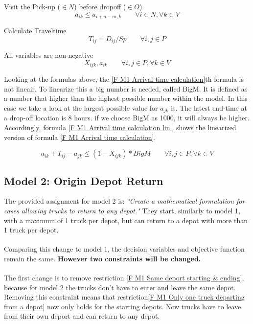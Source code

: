 Visit the Pick-up ($\in N$)  before dropoff ($\in O$) \\
\begin{equation} 
a_{ik} \leq a_{i+n-m,k}   \qquad  \forall i\in N, \forall k \in V
\label{F M1 Pick-up before dropp-off}
\end{equation}

Calculate Traveltime
\begin{equation} 
T_{ij} = D_{ij}/Sp    \qquad  \forall i,j \in P
\label{F M1 Calculate Traveltime}
\end{equation}

All variables are non-negative
\begin{equation} 
X_{ijk}, a_{ik}    \qquad  \forall i,j \in P, \forall k \in V
\label{F M1 All variables are non-negative}
\end{equation}


\vspace{0.5cm}

Looking at the formulas above, the \ref{F M1 Arrival time calculation}th formula is not lineair. To linearize this a big number is needed, called BigM. It is defined as a number that higher than the highest possible number within the model. In this case we take a look at the largest possible value for $a_{jk}$ is. The latest end-time at a drop-off location is 8 hours. if we choose  BigM as 1000, it will always be higher. Accordingly, formula \ref{F M1 Arrival time calculation lin.} shows the linearized version of formula \ref{F M1 Arrival time calculation}.


\begin{equation} 
a_{ik} + T_{ij} - a_{jk}  \leq (1-X_{ijk})*BigM  \qquad  \forall i,j \in P, \forall k \in V
\label{F M1 Arrival time calculation lin.}
\end{equation}




\newpage
\subsection{Model 2: Origin Depot Return}
The provided assignment for model 2 is: \textit{"Create a mathematical formulation for cases allowing trucks to return to any depot."} They start, similarly to model 1, with a maximum of 1 truck per depot, but can return to a depot with more than 1 truck per depot. \\
\\
Comparing this change to model 1, the decision variables and objective function remain the same.\textbf{ However two constraints will be changed.}\\
\\
The first change is to remove restriction \ref{F M1 Same deport starting & ending}, because for model 2 the trucks don't have to enter and leave the same depot. Removing this constraint means that restriction\ref{F M1 Only one truck departing from a depot} now only holds for the starting depots. Now trucks have to leave from their own deport and can return to any depot.




